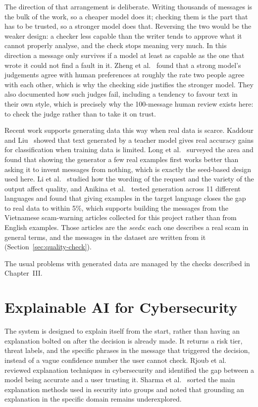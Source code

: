 The direction of that arrangement is deliberate. Writing thousands of messages is the bulk of the work, so a cheaper model does it; checking them is the part that has to be trusted, so a stronger model does that. Reversing the two would be the weaker design: a checker less capable than the writer tends to approve what it cannot properly analyse, and the check stops meaning very much. In this direction a message only survives if a model at least as capable as the one that wrote it could not find a fault in it. Zheng et al.~\cite{zheng2023judging} found that a strong model's judgements agree with human preferences at roughly the rate two people agree with each other, which is why the checking side justifies the stronger model. They also documented how such judges fail, including a tendency to favour text in their own style, which is precisely why the 100-message human review exists here: to check the judge rather than to take it on trust.

Recent work supports generating data this way when real data is scarce. Kaddour and Liu~\cite{kaddour2023synthetic} showed that text generated by a teacher model gives real accuracy gains for classification when training data is limited. Long et al.~\cite{long2024synthetic} surveyed the area and found that showing the generator a few real examples first works better than asking it to invent messages from nothing, which is exactly the seed-based design used here. Li et al.~\cite{li2024datageneration} studied how the wording of the request and the variety of the output affect quality, and Anikina et al.~\cite{anikina2025rigorous} tested generation across 11 different languages and found that giving examples in the target language closes the gap to real data to within 5\%, which supports building the messages from the Vietnamese scam-warning articles collected for this project rather than from English examples. Those articles are the \textit{seeds}: each one describes a real scam in general terms, and the messages in the dataset are written from it (Section~\ref{sec:quality-check}).

The usual problems with generated data are managed by the checks described in Chapter~III.

\section{Explainable AI for Cybersecurity}

The system is designed to explain itself from the start, rather than having an explanation bolted on after the decision is already made. It returns a risk tier, threat labels, and the specific phrases in the message that triggered the decision, instead of a vague confidence number the user cannot check. Rjoub et al.~\cite{rjoub2023surveyxai} reviewed explanation techniques in cybersecurity and identified the gap between a model being accurate and a user trusting it. Sharma et al.~\cite{sharma2025comprehensive} sorted the main explanation methods used in security into groups and noted that grounding an explanation in the specific domain remains underexplored.


